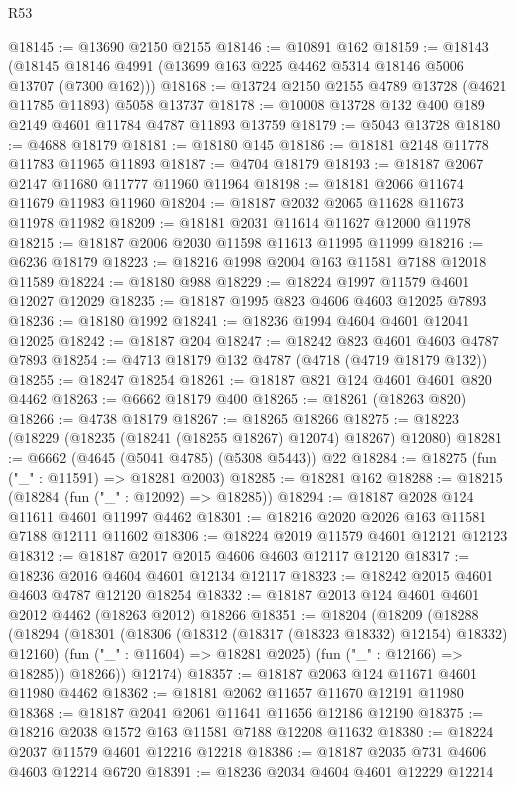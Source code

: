 \begin{lexlean}{R53}
\begin{coremodule}
@18145 := @13690 @2150 @2155
@18146 := @10891 @162
@18159 := @18143
    (@18145 @18146 @4991 (@13699 @163 @225 @4462 @5314 @18146 @5006 @13707 (@7300 @162)))
@18168 := @13724 @2150 @2155 @4789 @13728 (@4621 @11785 @11893) @5058 @13737
@18178 := @10008 @13728 @132 @400 @189 @2149 @4601 @11784 @4787 @11893 @13759
@18179 := @5043 @13728
@18180 := @4688 @18179
@18181 := @18180 @145
@18186 := @18181 @2148 @11778 @11783 @11965 @11893
@18187 := @4704 @18179
@18193 := @18187 @2067 @2147 @11680 @11777 @11960 @11964
@18198 := @18181 @2066 @11674 @11679 @11983 @11960
@18204 := @18187 @2032 @2065 @11628 @11673 @11978 @11982
@18209 := @18181 @2031 @11614 @11627 @12000 @11978
@18215 := @18187 @2006 @2030 @11598 @11613 @11995 @11999
@18216 := @6236 @18179
@18223 := @18216 @1998 @2004 @163 @11581 @7188 @12018 @11589
@18224 := @18180 @988
@18229 := @18224 @1997 @11579 @4601 @12027 @12029
@18235 := @18187 @1995 @823 @4606 @4603 @12025 @7893
@18236 := @18180 @1992
@18241 := @18236 @1994 @4604 @4601 @12041 @12025
@18242 := @18187 @204
@18247 := @18242 @823 @4601 @4603 @4787 @7893
@18254 := @4713 @18179 @132 @4787 (@4718 (@4719 @18179 @132))
@18255 := @18247 @18254
@18261 := @18187 @821 @124 @4601 @4601 @820 @4462
@18263 := @6662 @18179 @400
@18265 := @18261 (@18263 @820)
@18266 := @4738 @18179
@18267 := @18265 @18266
@18275 := @18223 (@18229 (@18235 (@18241 (@18255 @18267) @12074) @18267) @12080)
@18281 := @6662 (@4645 (@5041 @4785) (@5308 @5443)) @22
@18284 := @18275 (fun ("_" : @11591) => @18281 @2003)
@18285 := @18281 @162
@18288 := @18215 (@18284 (fun ("_" : @12092) => @18285))
@18294 := @18187 @2028 @124 @11611 @4601 @11997 @4462
@18301 := @18216 @2020 @2026 @163 @11581 @7188 @12111 @11602
@18306 := @18224 @2019 @11579 @4601 @12121 @12123
@18312 := @18187 @2017 @2015 @4606 @4603 @12117 @12120
@18317 := @18236 @2016 @4604 @4601 @12134 @12117
@18323 := @18242 @2015 @4601 @4603 @4787 @12120 @18254
@18332 := @18187 @2013 @124 @4601 @4601 @2012 @4462 (@18263 @2012) @18266
@18351 := @18204
    (@18209
      (@18288
        (@18294
          (@18301
            (@18306 (@18312 (@18317 (@18323 @18332) @12154) @18332) @12160)
            (fun ("_" : @11604) => @18281 @2025)
            (fun ("_" : @12166) => @18285))
          @18266))
      @12174)
@18357 := @18187 @2063 @124 @11671 @4601 @11980 @4462
@18362 := @18181 @2062 @11657 @11670 @12191 @11980
@18368 := @18187 @2041 @2061 @11641 @11656 @12186 @12190
@18375 := @18216 @2038 @1572 @163 @11581 @7188 @12208 @11632
@18380 := @18224 @2037 @11579 @4601 @12216 @12218
@18386 := @18187 @2035 @731 @4606 @4603 @12214 @6720
@18391 := @18236 @2034 @4604 @4601 @12229 @12214

\end{coremodule}
\end{lexlean}

